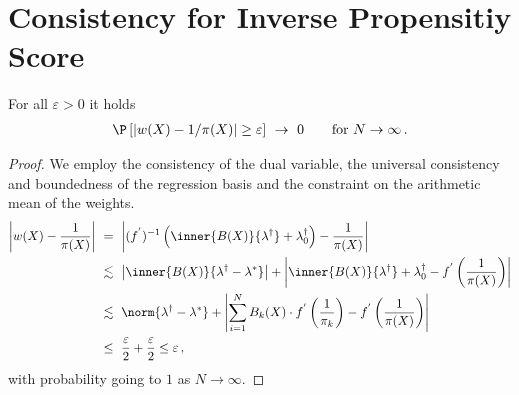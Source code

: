 \section*{Consistency for Inverse Propensitiy Score}
\begin{theorem}
  For all $\varepsilon>0$ it holds
  \begin{align*}
    \P
    \left[ 
  \left| 
  w(X)
  -
  1/\pi(X)
  \right|
  \ge
  \varepsilon
    \right]
    \ 
    \to
    \ 
    0
    \qquad
    \text{for}
    \ 
    N
    \to
    \infty
    \,.
\end{align*}
\end{theorem}
\begin{proof}
  We employ the consistency of the dual variable, the universal consistency and boundedness of the regression basis and the constraint on the arithmetic mean of the weights. 
\begin{align}
  \begin{split}
  \left| 
  w(X)
  -
  \frac{1}{\pi(X)}
  \right|
  &
  \ 
  =
  \ 
  \left| 
  (f^{'})^{-1}
  \left( 
    \inner{B(X)}
    {\lambda^\dagger}
    +
    \lambda_0^\dagger
  \right)
  -
  \frac{1}{\pi(X)}
  \right|
  \\
  &
  \ 
  \lesssim
  \ 
  \left| 
  \inner
  {B(X)}
  {\lambda^\dagger-\lambda^*}
  \right|
  +
  \left| 
    \inner{B(X)}
    {\lambda^\dagger}
    +
    \lambda_0^\dagger
    -
    f^{'}
    \left( 
  \frac{1}{\pi(X)}
    \right)
  \right|
  \\
  &
  \ 
  \lesssim
  \ 
  \norm{\lambda^\dagger-\lambda^*}
  +
  \left| 
  \sum_{i=1}^{N} 
  B_k(X)
  \cdot
    f^{'}
    \left( 
  \frac{1}{\pi_k}
    \right)
    -
    f^{'}
    \left( 
  \frac{1}{\pi(X)}
    \right)
  \right|
  \\
  &
  \ 
  \le
  \ 
  \frac{\varepsilon}{2}
+
  \frac{\varepsilon}{2}
  \le
  \varepsilon
  \,,
\end{split}
\end{align}
with probability going to $1$ as $N\to\infty$.
\end{proof}
